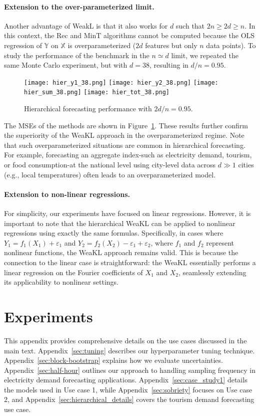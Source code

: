 \paragraph{Extension to the over-parameterized limit.} Another advantage of WeakL is that it also works for $d$ such that $2n \geq 2d \geq n$. 
In this context, the Rec and MinT algorithms cannot be computed because the OLS regression of $\mathbb Y$ on $\mathbb X$ is overparameterized ($2d$ features but only $n$ data points). 
To study the performance of the benchmark in the $n \simeq d$ limit, we repeated the same Monte Carlo experiment, but with $d = 38$, resulting in $d/n = 0.95$.
\begin{figure}
    \centering
    \texttt{[image: hier\_y1\_38.png]}
    \texttt{[image: hier\_y2\_38.png]}
    \texttt{[image: hier\_sum\_38.png]}
    \texttt{[image: hier\_tot\_38.png]}
    \caption{Hierarchical forecasting performance with $2d/n = 0.95$.}
    \label{fig:hier_2}
\end{figure}
The MSEs of the methods are shown in Figure~\ref{fig:hier_2}. These results further confirm the superiority of the WeaKL approach in the overparameterized regime. 
Note that such overparameterized situations are common in hierarchical forecasting.  
For example, forecasting an aggregate index-such as electricity demand, tourism, or food consumption-at the national level using city-level data across $d \gg 1$ cities (e.g., local temperatures) often leads to an overparameterized model.


\paragraph{Extension to non-linear regressions.} For simplicity, our experiments have focused on linear regressions. However, it is important to note that the hierarchical WeaKL can be applied to nonlinear regressions using exactly the same formulas. Specifically, in cases where $Y_1 = f_1(X_1) + \varepsilon_1$ and $Y_2 = f_2(X_2) - \varepsilon_1 + \varepsilon_2$, where $f_1$ and $f_2$ represent nonlinear functions, the WeaKL approach remains valid. This is because the connection to the linear case is straightforward: the WeaKL essentially performs a linear regression on the Fourier coefficients of $X_1$ and $X_2$, seamlessly extending its applicability to nonlinear settings.

\section{Experiments}
This appendix provides comprehensive details on the use cases discussed in the main text.
Appendix~\ref{sec:tuning} describes our hyperparameter tuning technique.
Appendix~\ref{sec:block-bootstrap} explains how we evaluate uncertainties.
Appendix~\ref{sec:half-hour} outlines our approach to handling sampling frequency in electricity demand forecasting applications.
Appendix~\ref{sec:case_study1} details the models used in Use case 1, while Appendix~\ref{sec:sobriety} focuses on Use case $2$, and Appendix~\ref{sec:hierarchical_details} covers the tourism demand forecasting use case.

